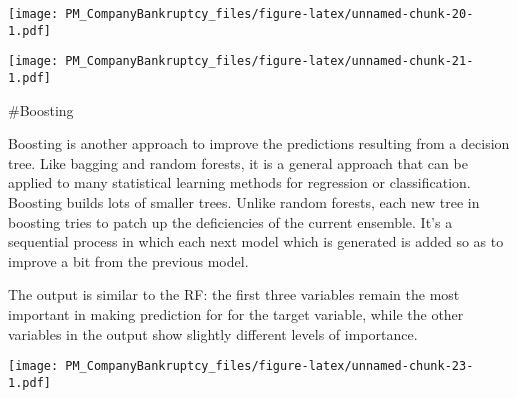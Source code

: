 \documentclass[
]{article}
\begin{document}
\texttt{[image: PM\_CompanyBankruptcy\_files/figure-latex/unnamed-chunk-20-1.pdf]}

\texttt{[image: PM\_CompanyBankruptcy\_files/figure-latex/unnamed-chunk-21-1.pdf]}

\#Boosting

Boosting is another approach to improve the predictions resulting from a
decision tree. Like bagging and random forests, it is a general approach
that can be applied to many statistical learning methods for regression
or classification. Boosting builds lots of smaller trees. Unlike random
forests, each new tree in boosting tries to patch up the deficiencies of
the current ensemble. It's a sequential process in which each next model
which is generated is added so as to improve a bit from the previous
model.

The output is similar to the RF: the first three variables remain the
most important in making prediction for for the target variable, while
the other variables in the output show slightly different levels of
importance.

\texttt{[image: PM\_CompanyBankruptcy\_files/figure-latex/unnamed-chunk-23-1.pdf]}
\end{document}
